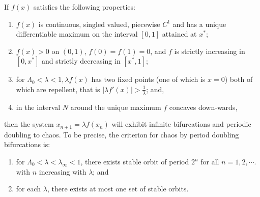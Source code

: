 \begin{thm}\label{th:criteria_for_infinite_bifurcations}
	If $f(x)$ satisfies the following properties:
	\begin{enumerate}
		\item $f(x)$ is continuous, singled valued, piecewise $C^1$ and has a unique differentiable maximum on the interval $[0,1]$ attained at $x^*$;
		\item $f(x) > 0$ on $(0,1)$, $f(0) = f(1) = 0$, and $f$ is strictly increasing in $[0, x^*]$ and strictly decreasing in $[x^*, 1]$;
		\item for $\Lambda_0 < \lambda < 1, \lambda f(x)$ has two fixed points (one of which is $x = 0$) both of which are repellent, that is $|\lambda f'(x)| > \frac{1}{\lambda}$; and,
		\item in the interval $N$ around the unique maximum $f$ concaves down-wards,
	\end{enumerate}
	then the system $x_{n+1} = \lambda f(x_n)$ will exhibit infinite bifurcations and periodic doubling to chaos.
	To be precise, the criterion for chaos by period doubling bifurcations is:
	\begin{enumerate}
		\item for $\Lambda_0 < \lambda < \lambda_{\infty} < 1$, there exists stable orbit of period $2^n$ for all $n = 1, 2, \cdots$. with $n$ increasing with $\lambda$; and
		\item for each $\lambda$, there exists at most one set of stable orbits.
	\end{enumerate}
\end{thm}

